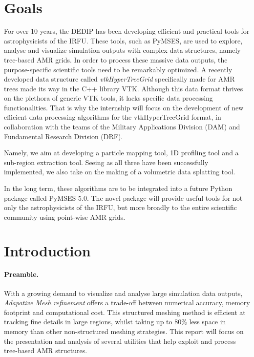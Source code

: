 \documentclass[
	a4paper,
	12pt,
	raggedright,
	twoside
]{tufte-style-article}
\theoremstyle{definition}
\theoremstyle{remark}
\begin{document}
\section{Goals}
For over 10 years, the DEDIP has been developing efficient and practical tools for astrophysicists of the IRFU. These tools, such as PyMSES, are used to explore, analyse and visualize simulation outputs with complex data structures, namely tree-based \Gls{AMR} grids. In order to process these massive data outputs, the purpose-specific scientific tools need to be remarkably optimized. A recently developed data structure called \textit{vtkHyperTreeGrid} specifically made for \Gls{AMR} trees made its way in the C++ library \Gls{VTK}. Although this data format thrives on the plethora of generic \Gls{VTK} tools, it lacks specific data processing functionalities. That is why the internship will focus on the development of new efficient data processing algorithms for the vtkHyperTreeGrid format, in collaboration with the teams of the Military Applications Division (DAM) and Fundamental Research Division (DRF).

Namely, we aim at developing a particle mapping tool, 1D profiling tool and a sub-region extraction tool. Seeing as all three have been successfully implemented, we also take on the making of a volumetric data splatting tool.

In the long term, these algorithms are to be integrated into a future Python package called PyMSES 5.0. The novel package will provide useful tools for not only the astrophysicists of the IRFU, but more broadly to the entire scientific community using point-wise \Gls{AMR} grids.

\section{Introduction}
\paragraph{Preamble.}
With a growing demand to visualize and analyse large simulation data outputs, \textit{Adapative Mesh refinement } offers a trade-off between numerical accuracy, memory footprint and computational cost. This structured meshing method is efficient at tracking fine details in large regions, whilst taking up to 80\% less space in memory than other non-structured meshing strategies.\cite{HTG_dam} This report will focus on the presentation and analysis of several utilities that help exploit and process tree-based \Gls{AMR} structures.
\end{document}
